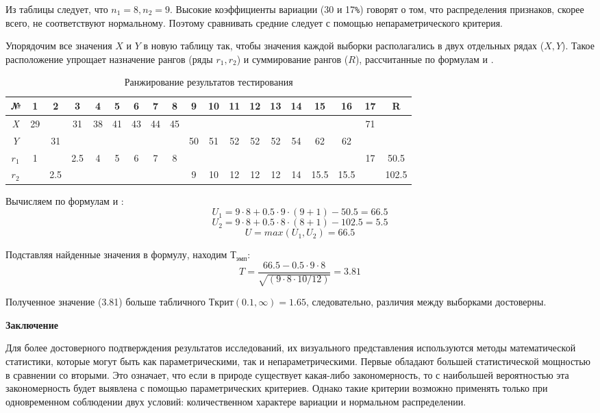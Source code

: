 \documentclass[12pt]{article}
\begin{document}
 
Из таблицы  следует, что $n_1 = 8, n_2 = 9$. Высокие коэффициенты вариации (30 и 17\verb!%!) говорят о том, что распределения признаков, скорее всего, не соответствуют нормальному. Поэтому сравнивать средние следует с помощью непараметрического критерия.

Упорядочим все значения $X$ и $Y$ в новую таблицу  так, чтобы значения каждой выборки располагались в двух отдельных рядах ($X, Y$). Такое расположение упрощает назначение рангов (ряды $r_1, r_2$) и суммирование рангов ($R$), рассчитанные по формулам и .

\begin{table}[h]
    \centering
    \caption{Ранжирование результатов тестирования}
    \bigskip
    \begin{tabular}{|c|c|c|c|c|c|c|c|c|c|c|c|c|c|c|c|c|c|c|} \hline
        \textit{№} &1&2&3&4&5&6&7&8&9&10&11&12&13&14&15&16&17&R \\ \hline
        \textit{X} &29&&31&38&41&43&44&45&&&&&&&&&71&  \\ \hline
        \textit{Y} &&31&&&&&&&50&51&52&52&52&54&62&62&&  \\  \hline
        \textit{$r_1$} &1&&2.5&4&5&6&7&8&&&&&&&&&17&50.5  \\  \hline
        \textit{$r_2$} &&2.5&&&&&&&9&10&12&12&12&14&15.5&15.5&&102.5  \\  \hline
    \end{tabular}
\end{table}

Вычисляем по формулам и :
$$
    U_1 = 9 \cdot 8 + 0.5 \cdot 9 \cdot (9+1) - 50.5 = 66.5
$$
$$
    U_2 = 9 \cdot 8 + 0.5 \cdot 8 \cdot (8+1) - 102.5 = 5.5   
$$
$$
    U = max(U_1, U_2) = 66.5
$$
  
Подставляя найденные значения в формулу, находим $Т_{эмп}$:
$$
    T =\frac{66.5 - 0.5 \cdot 9 \cdot 8}{\sqrt{(9 \cdot 8 \cdot 10/12)}} = 3.81
$$
  
Полученное значение (3.81) больше табличного $Ткрит(0.1, \infty) = 1.65$, следовательно, различия между выборками достоверны.

\medskip
\textbf{Заключение}

\medskip
Для более достоверного подтверждения результатов исследований, их визуального представления используются методы математической статистики, которые могут быть как параметрическими, так и непараметрическими.
Первые обладают большей статистической мощностью в сравнении со вторыми. Это означает, что если в природе существует какая-либо закономерность, то с наибольшей вероятностью эта закономерность будет выявлена с помощью параметрических критериев. Однако такие критерии возможно применять только при одновременном соблюдении двух условий: количественном характере вариации и нормальном распределении.
\end{document}
